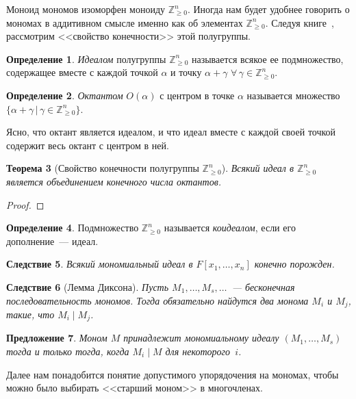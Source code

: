 \documentclass[a4paper,reqno,12pt]{amsart}
\theoremstyle{plain}
\newtheorem{theorem}{Теорема}[section]
\newtheorem{proposition}[theorem]{Предложение}
\newtheorem{corollary}[theorem]{Следствие}
\theoremstyle{remark}
\theoremstyle{definition}
\newtheorem{definition}[theorem]{Определение}
\renewcommand{\ge}{\geqslant}
\newcommand{\Z}{\mathbb{Z}}
\newcommand{\Zplusn}{\Z_{\ge 0}^n}
\begin{document}
Моноид мономов изоморфен моноиду $\Zplusn$. Иногда нам будет удобнее говорить о мономах в аддитивном смысле именно как об элементах $\Z_{\ge 0}^n$. Следуя книге~\cite{Zplusn}, рассмотрим <<свойство конечности>> этой полугруппы.

\begin{definition}
\emph{Идеалом} полугруппы $\Zplusn$ называется всякое ее подмножество, содержащее вместе с каждой точкой $\alpha$ и точку $\alpha + \gamma$ $\forall\,\gamma \in \Zplusn$.
\end{definition}

\begin{definition}
\emph{Октантом} $O(\alpha)$ с центром в точке $\alpha$ называется множество $\{\alpha + \gamma \, | \, \gamma \in \Zplusn\}$.
\end{definition}

Ясно, что октант является идеалом, и что идеал вместе с каждой своей точкой содержит весь октант с центром в ней.

\begin{theorem}[Свойство конечности полугруппы $\Zplusn$]
Всякий идеал в $\Zplusn$ является объединением конечного числа октантов.
\end{theorem}

\begin{proof}
\end{proof}

\begin{definition}
Подмножество $\Zplusn$ называется \emph{коидеалом}, если его дополнение~--- идеал.
\end{definition}

\begin{corollary}
\label{HilbertBasisMonomial}
Всякий мономиальный идеал в $F[x_1,\ldots,x_n]$ конечно порожден.
\end{corollary}

\begin{corollary}[Лемма Диксона]
Пусть $M_1, \ldots, M_s, \ldots$~--- бесконечная последовательность мономов. Тогда
обязательно найдутся два монома $M_i$ и $M_j$, такие, что $M_i \mid M_j$.
\end{corollary}

\begin{proposition}
Моном $M$ принадлежит мономиальному идеалу $(M_1, \ldots, M_s)$ тогда и только тогда, когда $M_i \mid M$ для некоторого~$i$.
\end{proposition}


Далее нам понадобится понятие допустимого упорядочения на мономах, чтобы можно было выбирать <<старший моном>> в многочленах.
\end{document}
